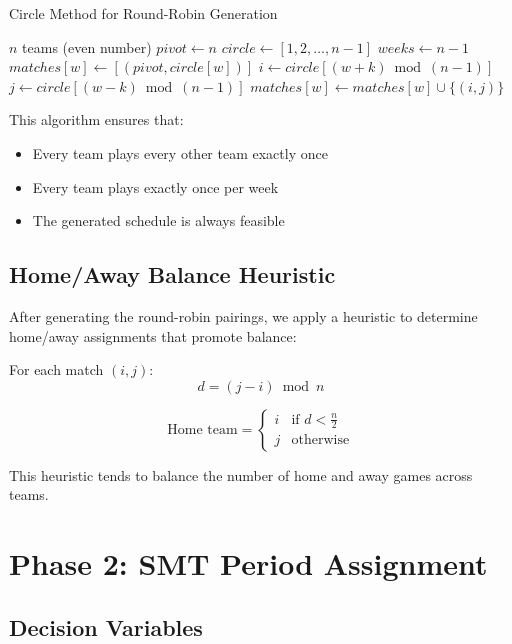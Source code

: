 \documentclass{article}
\begin{document}
\begin{algorithm}
\caption{Circle Method for Round-Robin Generation}
\begin{algorithmic}[1]
\REQUIRE $n$ teams (even number)
\STATE $pivot \leftarrow n$
\STATE $circle \leftarrow [1, 2, \ldots, n-1]$
\STATE $weeks \leftarrow n - 1$
    \STATE $matches[w] \leftarrow [(pivot, circle[w])]$
        \STATE $i \leftarrow circle[(w + k) \bmod (n-1)]$
        \STATE $j \leftarrow circle[(w - k) \bmod (n-1)]$
        \STATE $matches[w] \leftarrow matches[w] \cup \{(i, j)\}$
    \ENDFOR
\ENDFOR
\end{algorithmic}
\end{algorithm}

This algorithm ensures that:
\begin{itemize}
    \item Every team plays every other team exactly once
    \item Every team plays exactly once per week
    \item The generated schedule is always feasible
\end{itemize}

\subsection{Home/Away Balance Heuristic}

After generating the round-robin pairings, we apply a heuristic to determine home/away assignments that promote balance:

For each match $(i, j)$:
\begin{equation}
d = (j - i) \bmod n
\end{equation}

\begin{equation}
\text{Home team} = \begin{cases}
i & \text{if } d < \frac{n}{2} \\
j & \text{otherwise}
\end{cases}
\end{equation}

This heuristic tends to balance the number of home and away games across teams.

\section{Phase 2: SMT Period Assignment}

\subsection{Decision Variables}
\end{document}
